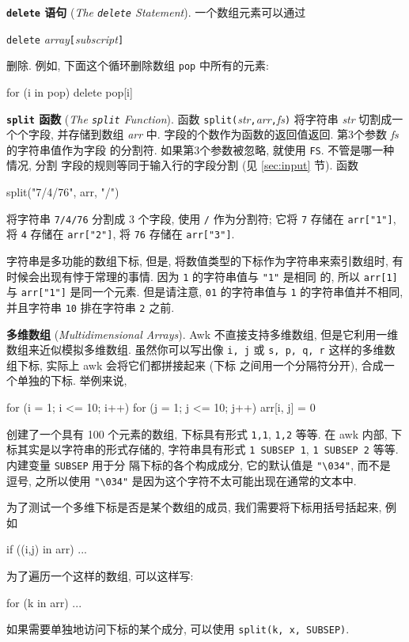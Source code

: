 \textbf{\texttt{delete} 语句} (\emph{The \texttt{delete} Statement}).
一个数组元素可以通过
\begin{pattern}
    \verb'delete' \textit{array}\verb'['\textit{subscript}\verb']'
\end{pattern}
删除. 例如, 下面这个循环删除数组 \verb'pop' 中所有的元素:
\begin{awkcode}
    for (i in pop)
        delete pop[i]
\end{awkcode}

\textbf{\texttt{split} 函数} (\emph{The \texttt{split} Function}). 函数
\verb'split('\textit{str}\verb','\textit{arr}\verb','\textit{fs}\verb')'
将字符串 \textit{str} 切割成一个个字段, 并存储到数组 \textit{arr} 中.
字段的个数作为函数的返回值返回. 第3个参数 \textit{fs} 的字符串值作为字段
的分割符. 如果第3个参数被忽略, 就使用 \verb'FS'. 不管是哪一种情况, 分割
字段的规则等同于输入行的字段分割 (见 \ref{sec:input} 节). 函数
\begin{awkcode}
    split("7/4/76", arr, "/")
\end{awkcode}
将字符串 \verb'7/4/76' 分割成 3 个字段, 使用 \verb'/' 作为分割符; 它将
\verb'7' 存储在 \verb'arr["1"]', 将 \verb'4' 存储在 \verb'arr["2"]',
将 \verb'76' 存储在 \verb'arr["3"]'.

字符串是多功能的数组下标, 但是, 将数值类型的下标作为字符串来索引数组时,
有时候会出现有悖于常理的事情. 因为 \verb'1' 的字符串值与 \verb'"1"' 是相同
的, 所以 \verb'arr[1]' 与 \verb'arr["1"]' 是同一个元素. 但是请注意,
\verb'01' 的字符串值与 \verb'1' 的字符串值并不相同, 并且字符串 \verb'10'
排在字符串 \verb'2' 之前.

\textbf{多维数组} (\emph{Multidimensional Arrays}). Awk 不直接支持多维数组,
但是它利用一维数组来近似模拟多维数组. 虽然你可以写出像 \verb'i, j' 或
\verb's, p, q, r' 这样的多维数组下标, 实际上 awk 会将它们都拼接起来 (下标
之间用一个分隔符分开), 合成一个单独的下标. 举例来说,
\begin{awkcode}
    for (i = 1; i <= 10; i++)
        for (j = 1; j <= 10; j++)
            arr[i, j] = 0
\end{awkcode}
创建了一个具有 100 个元素的数组, 下标具有形式 \verb'1,1', \verb'1,2' 等等.
在 awk 内部, 下标其实是以字符串的形式存储的, 字符串具有形式
\verb'1 SUBSEP 1', \verb'1 SUBSEP 2' 等等. 内建变量 \verb'SUBSEP' 用于分
隔下标的各个构成成分, 它的默认值是 \verb'"\034"', 而不是 逗号, 之所以使用
\verb'"\034"' 是因为这个字符不太可能出现在通常的文本中.

为了测试一个多维下标是否是某个数组的成员, 我们需要将下标用括号括起来, 例如 
\begin{awkcode}
    if ((i,j) in arr) ...
\end{awkcode}
为了遍历一个这样的数组, 可以这样写:
\begin{awkcode}
    for (k in arr) ...
\end{awkcode}
如果需要单独地访问下标的某个成分, 可以使用 \verb'split(k, x, SUBSEP)'.

